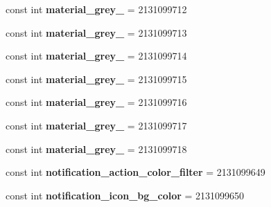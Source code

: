 \begin{DoxyCompactItemize}
const int {\bfseries material\+\_\+grey\+\_} = 2131099712
\item 
\mbox{\label{classst_delivery_1_1_resource_1_1_color_ab021b2f86f51f002e38087999b6d443c}} 
const int {\bfseries material\+\_\+grey\+\_} = 2131099713
\item 
\mbox{\label{classst_delivery_1_1_resource_1_1_color_a3edbe9752f10e06548e1b489cda0f541}} 
const int {\bfseries material\+\_\+grey\+\_} = 2131099714
\item 
\mbox{\label{classst_delivery_1_1_resource_1_1_color_af3af9c4279e3478b58357aefb38573b7}} 
const int {\bfseries material\+\_\+grey\+\_} = 2131099715
\item 
\mbox{\label{classst_delivery_1_1_resource_1_1_color_a6963e94d76bc7442c8a0f33ee8e68ee8}} 
const int {\bfseries material\+\_\+grey\+\_} = 2131099716
\item 
\mbox{\label{classst_delivery_1_1_resource_1_1_color_a8b4ebba4d3c06141557776a0d1ac6ad0}} 
const int {\bfseries material\+\_\+grey\+\_} = 2131099717
\item 
\mbox{\label{classst_delivery_1_1_resource_1_1_color_abfd73ba0fdaea819de19c0b64709eaeb}} 
const int {\bfseries material\+\_\+grey\+\_} = 2131099718
\item 
\mbox{\label{classst_delivery_1_1_resource_1_1_color_a50390a36fdd20f6fb5526565c64383b4}} 
const int {\bfseries notification\+\_\+action\+\_\+color\+\_\+filter} = 2131099649
\item 
\mbox{\label{classst_delivery_1_1_resource_1_1_color_ae5df051685998a5e33798b8f414436fb}} 
const int {\bfseries notification\+\_\+icon\+\_\+bg\+\_\+color} = 2131099650
\item 
\mbox{\label{classst_delivery_1_1_resource_1_1_color_ae5ed32ffc6e9d3eb7e35c19efbe3f747}} 

\end{DoxyCompactItemize}
